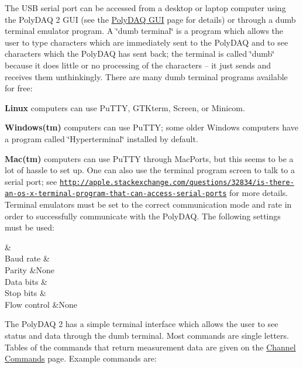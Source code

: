 The U\-S\-B serial port can be accessed from a desktop or laptop computer using the Poly\-D\-A\-Q 2 G\-U\-I (see the \hyperlink{pd_py_gui}{Poly\-D\-A\-Q G\-U\-I} page for details) or through a dumb terminal emulator program. A \char`\"{}dumb terminal\char`\"{} is a program which allows the user to type characters which are immediately sent to the Poly\-D\-A\-Q and to see characters which the Poly\-D\-A\-Q has sent back; the terminal is called \char`\"{}dumb\char`\"{} because it does little or no processing of the characters -- it just sends and receives them unthinkingly. There are many dumb terminal programs available for free\-:
\begin{DoxyItemize}
\item {\bfseries Linux} computers can use Pu\-T\-T\-Y, G\-T\-Kterm, Screen, or Minicom.
\item {\bfseries Windows(tm)} computers can use Pu\-T\-T\-Y; some older Windows computers have a program called \char`\"{}\-Hyperterminal\char`\"{} installed by default.
\item {\bfseries Mac(tm)} computers can use Pu\-T\-T\-Y through Mac\-Ports, but this seems to be a lot of hassle to set up. One can also use the terminal program {\ttfamily screen} to talk to a serial port; see {\ttfamily \href{http://apple.stackexchange.com/questions/32834/is-there-an-os-x-terminal-program-that-can-access-serial-ports}{\tt http\-://apple.\-stackexchange.\-com/questions/32834/is-\/there-\/an-\/os-\/x-\/terminal-\/program-\/that-\/can-\/access-\/serial-\/ports}} for more details. Terminal emulators must be set to the correct communication mode and rate in order to successfully communicate with the Poly\-D\-A\-Q. The following settings must be used\-: \begin{TabularC}{2}
\hline
{}&\PBS\centering {\bf }\\
Baud rate &\PBS{} \\
Parity &\PBS\centering None \\
Data bits &\PBS{} \\
Stop bits &\PBS{} \\
Flow control &\PBS\centering None \\
\end{TabularC}
The Poly\-D\-A\-Q 2 has a simple terminal interface which allows the user to see status and data through the dumb terminal. Most commands are single letters. Tables of the commands that return measurement data are given on the \hyperlink{pd_channels}{Channel Commands} page. Example commands are\-:

\end{DoxyItemize}
